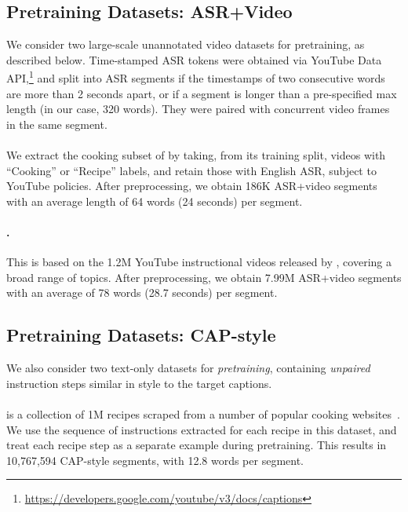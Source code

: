 \documentclass[11pt,a4paper]{article}
\begin{document}
\subsection{Pretraining Datasets: ASR+Video}

We consider two large-scale unannotated video datasets for pretraining, as described below. Time-stamped ASR tokens were obtained via YouTube Data API,\footnote{\url{https://developers.google.com/youtube/v3/docs/captions}}
and split into ASR segments if the timestamps of two consecutive words are more than 2 seconds apart, or if a segment is longer than a pre-specified max length (in our case, 320 words).
They were paired with concurrent video frames in the same segment.


\paragraph{\ytdatasub} 
We extract the cooking subset of \ytdata\citep{abu2016youtube} by taking, from its training split, videos with  ``Cooking'' or ``Recipe'' labels, and retain those with English ASR, subject to YouTube policies.
After preprocessing, we obtain 186K ASR+video segments with an average length of 64 words (24 seconds) per segment. 

\paragraph{\howto.}  This is based on the 1.2M YouTube instructional videos released by , covering a broad range of topics.  
After preprocessing, we obtain 7.99M ASR+video segments with an average of 78 words (28.7 seconds) per segment.


\subsection{Pretraining Datasets: CAP-style}

We also consider two text-only datasets for \textit{pretraining}, containing \textit{unpaired} instruction steps similar in style to the target captions.


\paragraph{\recipes} is a collection of 1M recipes scraped from a number of popular cooking websites~\citep{marin2019recipe1m+}. We use the sequence of instructions extracted for each recipe in this dataset, and treat each recipe step as a separate example during pretraining.
This results in 10,767,594 CAP-style segments, with 12.8 words per segment.
\end{document}
